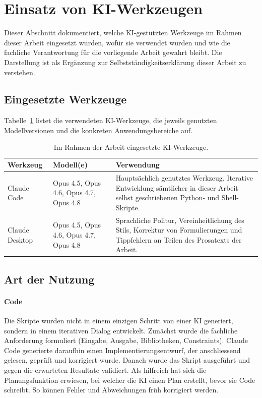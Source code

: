 \section{Einsatz von KI-Werkzeugen}
\label{sec:ki_werkzeuge}

Dieser Abschnitt dokumentiert, welche KI-gestützten Werkzeuge im Rahmen dieser Arbeit eingesetzt wurden, wofür sie verwendet wurden und wie die fachliche Verantwortung für die vorliegende Arbeit gewahrt bleibt.
Die Darstellung ist als Ergänzung zur Selbstständigkeitserklärung dieser Arbeit zu verstehen.

\subsection{Eingesetzte Werkzeuge}
\label{sec:ki_werkzeuge_uebersicht}

Tabelle~\ref{tab:ki_werkzeuge} listet die verwendeten KI-Werkzeuge, die jeweils genutzten Modellversionen und die konkreten Anwendungsbereiche auf.

\begin{table}[H]
\centering
\caption{Im Rahmen der Arbeit eingesetzte KI-Werkzeuge.}
\label{tab:ki_werkzeuge}
\begin{tabular}{p{3.6cm}p{3.4cm}p{6.5cm}}
\hline
Werkzeug & Modell(e) & Verwendung \\
\hline
Claude Code & Opus 4.5, Opus 4.6, Opus 4.7, Opus 4.8 & Hauptsächlich genutztes Werkzeug. Iterative Entwicklung sämtlicher in dieser Arbeit selbst geschriebenen Python- und Shell-Skripte. \\
Claude Desktop & Opus 4.5, Opus 4.6, Opus 4.7, Opus 4.8 & Sprachliche Politur, Vereinheitlichung des Stils, Korrektur von Formulierungen und Tippfehlern an Teilen des Prosatexts der Arbeit. \\
\hline
\end{tabular}
\end{table}

\subsection{Art der Nutzung}
\label{sec:ki_werkzeuge_nutzung}

\paragraph{Code}
Die Skripte wurden nicht in einem einzigen Schritt von einer KI generiert, sondern in einem iterativen Dialog entwickelt.
Zunächst wurde die fachliche Anforderung formuliert (Eingabe, Ausgabe, Bibliotheken, Constraints).
Claude Code generierte daraufhin einen Implementierungsentwurf, der anschliessend gelesen, geprüft und korrigiert wurde.
Danach wurde das Skript ausgeführt und gegen die erwarteten Resultate validiert.
Als hilfreich hat sich die Planungsfunktion erwiesen, bei welcher die KI einen Plan erstellt, bevor sie Code schreibt.
So können Fehler und Abweichungen früh korrigiert werden.


